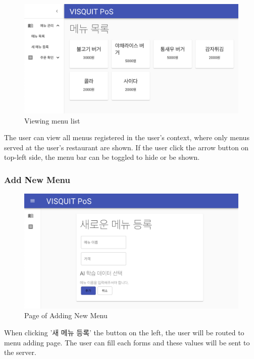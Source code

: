 \documentclass[conference,compsoc]{IEEEtran}
\begin{document}
\begin{figure}[ht!]
  \includegraphics[width=\linewidth]{figures/frontend/02-menulist.png}
  \caption{Viewing menu list}
  \label{fig:02-menulist}
\end{figure}

The user can view all menus registered in the user's context, where only menus served at the user's restaurant are shown. If the user click the arrow button on top-left side, the menu bar can be toggled to hide or be shown.

\subsubsection{Add New Menu}

\begin{figure}[ht!]
  \includegraphics[width=\linewidth]{figures/frontend/03-newmenu-landing.png}
  \caption{Page of Adding New Menu}
  \label{fig:03-newmenu-landing}
\end{figure}

When clicking '새 메뉴 등록' the button on the left, the user will be routed to menu adding page. The user can fill each forms and these values will be sent to the server.
\end{document}
